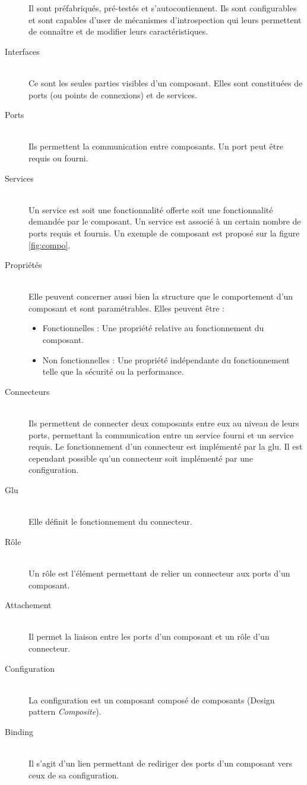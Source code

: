 \begin{description}
  Il sont préfabriqués, pré-testés et s'autocontiennent. Ils sont configurables et sont capables d'user de mécanismes d'introspection qui leurs permettent de connaître et de modifier leurs caractéristiques.
\item[Interfaces] \hfill \\
  Ce sont les seules parties visibles d'un composant. Elles sont constituées de ports (ou points de connexions) et de services.
\item[Ports]\hfill \\
  Ils permettent la communication entre composants. Un port peut être requis ou fourni.  
\item[Services] \hfill \\ Un service est soit une fonctionnalité offerte soit une fonctionnalité demandée  par le composant. Un service est associé à un certain nombre de ports requis et fournis. Un exemple de composant est proposé sur la figure \ref{fig:compo}.
\item[Propriétés] \hfill \\  Elle peuvent concerner aussi bien la structure que le comportement d'un composant et sont paramétrables. Elles peuvent être :
  \begin{itemize}
  \item 
    Fonctionnelles : Une propriété relative au fonctionnement du composant.
  \item 
    Non fonctionnelles : Une propriété indépendante du fonctionnement telle que la sécurité ou la performance.
  \end{itemize}
\item[Connecteurs] \hfill \\
  Ils permettent de connecter deux composants entre eux au niveau de leurs ports, permettant la communication entre un service fourni et un service requis. Le fonctionnement d'un connecteur est implémenté par la glu. Il est cependant possible qu'un connecteur soit implémenté par une configuration.
\item[Glu] \hfill \\
  Elle définit le fonctionnement du connecteur.
\item[Rôle] \hfill \\
  Un rôle est l'élément permettant de relier un connecteur aux ports d'un composant.
\item[Attachement] \hfill \\
  Il permet la liaison entre les ports d'un composant et un rôle d'un connecteur.
\item[Configuration] \hfill \\
  La configuration est un composant composé de composants (Design pattern \emph{Composite}).
\item[Binding] \hfill \\
  Il s'agit d'un lien permettant de rediriger des ports d'un composant vers ceux de sa configuration.

\end{description}
